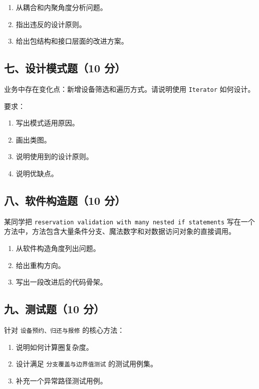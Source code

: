 \documentclass[UTF8,zihao=-4]{ctexart}
\begin{document}
\begin{enumerate}
\item 从耦合和内聚角度分析问题。
\item 指出违反的设计原则。
\item 给出包结构和接口层面的改进方案。
\end{enumerate}


\subsection{七、设计模式题（10 分）}


业务中存在变化点：新增设备筛选和遍历方式。请说明使用 \texttt{Iterator} 如何设计。


要求：


\begin{enumerate}
\item 写出模式适用原因。
\item 画出类图。
\item 说明使用到的设计原则。
\item 说明优缺点。
\end{enumerate}


\subsection{八、软件构造题（10 分）}


某同学把 \texttt{reservation validation with many nested if statements} 写在一个方法中，方法包含大量条件分支、魔法数字和对数据访问对象的直接调用。


\begin{enumerate}
\item 从软件构造角度列出问题。
\item 给出重构方向。
\item 写出一段改进后的代码骨架。
\end{enumerate}


\subsection{九、测试题（10 分）}


针对 \texttt{设备预约、归还与报修} 的核心方法：


\begin{enumerate}
\item 说明如何计算圈复杂度。
\item 设计满足 \texttt{分支覆盖与边界值测试} 的测试用例集。
\item 补充一个异常路径测试用例。
\end{enumerate}
\end{document}
